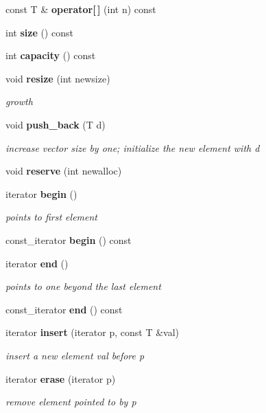 \begin{DoxyCompactItemize}
const T \& {\bfseries operator[$\,$]} (int n) const
\item 
\mbox{\label{classmy_std_1_1vector_a72c4cf7716f3fb1db42b8cdc2347ef49}} 
int {\bfseries size} () const
\item 
\mbox{\label{classmy_std_1_1vector_a3a84d877c0808556734d2e012f8bbdaf}} 
int {\bfseries capacity} () const
\item 
\mbox{\label{classmy_std_1_1vector_aa54bd9c3d8d3b6191d7eb7f85490eadb}} 
void \textbf{ resize} (int newsize)
\begin{DoxyCompactList}\small\item\em growth \end{DoxyCompactList}\item 
\mbox{\label{classmy_std_1_1vector_a16a7791abc12b34fee94f4ef48a5e157}} 
void \textbf{ push\+\_\+back} (T d)
\begin{DoxyCompactList}\small\item\em increase vector size by one; initialize the new element with d \end{DoxyCompactList}\item 
\mbox{\label{classmy_std_1_1vector_a50e786a02a59e689999365037ae26b3a}} 
void {\bfseries reserve} (int newalloc)
\item 
\mbox{\label{classmy_std_1_1vector_adaa284b6b387f70d3244b4d6e64869c3}} 
iterator \textbf{ begin} ()
\begin{DoxyCompactList}\small\item\em points to first element \end{DoxyCompactList}\item 
\mbox{\label{classmy_std_1_1vector_ad22f43aad2b965682d953dec7dd6edfb}} 
const\+\_\+iterator {\bfseries begin} () const
\item 
\mbox{\label{classmy_std_1_1vector_a8fc7ec068c194f5ecb5a08e17a9c9ac4}} 
iterator \textbf{ end} ()
\begin{DoxyCompactList}\small\item\em points to one beyond the last element \end{DoxyCompactList}\item 
\mbox{\label{classmy_std_1_1vector_afc5b4c0fa098396326835e4e8f008177}} 
const\+\_\+iterator {\bfseries end} () const
\item 
\mbox{\label{classmy_std_1_1vector_a2dfafafc64febfbb0869be81f6bd4de7}} 
iterator \textbf{ insert} (iterator p, const T \&val)
\begin{DoxyCompactList}\small\item\em insert a new element val before p \end{DoxyCompactList}\item 
\mbox{\label{classmy_std_1_1vector_aa4ecb71647140e3c5226299f84828984}} 
iterator \textbf{ erase} (iterator p)
\begin{DoxyCompactList}\small\item\em remove element pointed to by p \end{DoxyCompactList}\end{DoxyCompactItemize}


